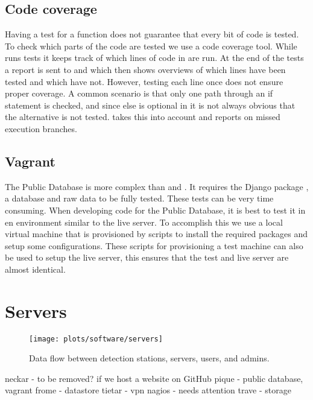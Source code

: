 \subsection{Code coverage}

Having a test for a function does not guarantee that every bit of code
is tested. To check which parts of the code are tested we use a code
coverage tool. While \travis runs tests it keeps track of which lines of
code in \sapphire are run. At the end of the tests a report is sent to
\coveralls \cite{coveralls} and \codecov \cite{codecov} which then shows overviews of which lines have been tested and which have not. However, testing each line once does not ensure proper coverage. A common scenario is that only one path through an if statement is checked, and since else is optional in \python it is not always obvious that the alternative is not tested. \codecov takes this into account and reports on missed execution branches.


\subsection{Vagrant}

The Public Database is more complex than \sapphire and \jsparc. It
requires the Django package \cite{django}, a database and raw data to be
fully tested. These tests can be very time consuming. When developing
code for the Public Database, it is best to test it in en environment
similar to the live server. To accomplish this we use a local virtual
machine that is provisioned by scripts to install the required packages
and setup some configurations. These scripts for provisioning a test
machine can also be used to setup the live server, this ensures that the
test and live server are almost identical.



\section{Servers}


\begin{figure}
    \centering
    \texttt{[image: plots/software/servers]}
    \caption{Data flow between detection stations, servers, users, and admins.}
    \label{fig:servers}
\end{figure}


neckar - to be removed? if we host a website on GitHub
pique - public database, vagrant
frome - datastore
tietar - vpn nagios - needs attention
trave - storage
